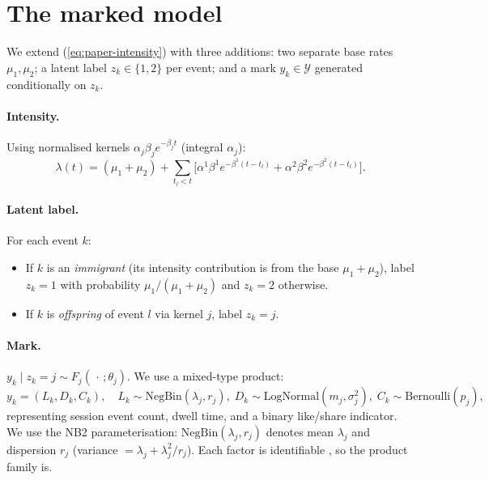 \documentclass[11pt]{article}
\theoremstyle{remark}
\newcommand{\NegBin}{\mathrm{NegBin}}
\newcommand{\LogNormal}{\mathrm{LogNormal}}
\newcommand{\Bernoulli}{\mathrm{Bernoulli}}
\begin{document}
\section{The marked model}
\label{sec:model}

We extend (\ref{eq:paper-intensity}) with three additions: two separate base rates $\mu_1, \mu_2$; a latent label $z_k \in \{1, 2\}$ per event; and a mark $y_k \in \mathcal{Y}$ generated conditionally on $z_k$.

\paragraph{Intensity.} Using normalised kernels $\alpha_j \beta_j e^{-\beta_j t}$ (integral $\alpha_j$):
\begin{equation}
\lambda(t) = (\mu_1 + \mu_2) + \sum_{t_l < t}\Big[\alpha^1 \beta^1 e^{-\beta^1(t-t_l)} + \alpha^2 \beta^2 e^{-\beta^2(t-t_l)}\Big]. \label{eq:marked-intensity}
\end{equation}

\paragraph{Latent label.} For each event $k$:
\begin{itemize}[leftmargin=*,nosep]
\item If $k$ is an \emph{immigrant} (its intensity contribution is from the base $\mu_1 + \mu_2$), label $z_k = 1$ with probability $\mu_1 / (\mu_1 + \mu_2)$ and $z_k = 2$ otherwise.
\item If $k$ is \emph{offspring} of event $l$ via kernel $j$, label $z_k = j$.
\end{itemize}

\paragraph{Mark.} $y_k \mid z_k = j \sim F_j(\,\cdot\,; \theta_j)$. We use a mixed-type product:
\begin{equation*}
y_k = (L_k, D_k, C_k), \quad L_k \sim \NegBin(\lambda_j, r_j), \; D_k \sim \LogNormal(m_j, \sigma_j^2), \; C_k \sim \Bernoulli(p_j),
\end{equation*}
representing session event count, dwell time, and a binary like/share indicator. We use the NB2 parameterisation: $\NegBin(\lambda_j, r_j)$ denotes mean $\lambda_j$ and dispersion $r_j$ (variance $= \lambda_j + \lambda_j^2/r_j$). Each factor is identifiable \citep{teicher1963finite}, so the product family is.
\end{document}
